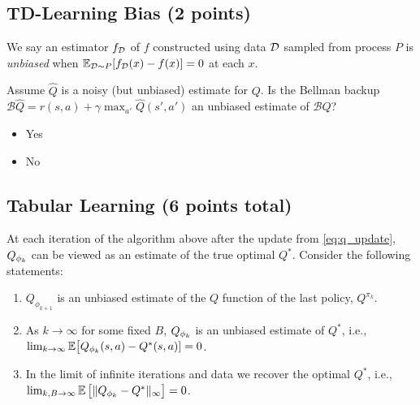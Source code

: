 \def\makecols#1#2{{\def\p{#2}\newcount\i\i0\hfill\loop\advance\i1\makebox[1cm][c]{\expandafter\p\the\i}\kern.5cm\ifnum\i<#1\repeat\kern-1cm}}
\def\heading#1{\bf\expandafter\uppercase\expandafter{\romannumeral#1.}}
\def\boxes#1{\ensuremath\square}
\def\filled#1#2|#3{\ifnum#1=#3\ensuremath\blacksquare
	\else\if\relax#2\relax\ensuremath\square
	\else\filled#2|#3\fi\fi}
\def\ncol{3}
\newcommand{\checkeditem}[2]{\edef\x{0#1}\item[\expandafter\filled\x|#2]}


\def\choices#1#2{
	\begin{enumerate}
	\item on-policy in tabular setting \makecols\ncol{\filled0#1|}
	\item off-policy in tabular setting \makecols\ncol{\filled0#2|}
	\end{enumerate}
}

\subsection{TD-Learning Bias (2 points)}
\label{q:td_bias}

\def\answer{2} %
\ifsolutions\solve\thesubsection\fi
We say an estimator $f_{\mathcal{D}}$ of $f$ constructed using data $\mathcal{D}$ sampled from process $P$ is \textit{unbiased} when $\mathbb{E}_{\mathcal{D}\sim P}[f_{\mathcal{D}}(x)-f(x)]=0$ at each $x$.

Assume $\hat Q$ is a noisy (but unbiased) estimate for $Q$. Is the Bellman backup $\mathcal{B}\hat Q = r(s, a) + \gamma \max_{a'} \hat Q(s', a')$ an unbiased estimate of $\mathcal{B}Q$?
\begin{itemize}
    \checkeditem\answer1 Yes
    \checkeditem\answer2 No
\end{itemize}

\subsection{Tabular Learning (6 points total)}
\label{q:tabular_learning}

At each iteration of the algorithm above after the update from \cref{eq:q_update}, $Q_{\phi_k}$ can be viewed as an estimate of the true optimal $Q^*$. Consider the following statements: 
\begin{enumerate}[label=\bf\Roman*.]
  \item $Q_{\phi_{k+1}}$ is an unbiased estimate of the $Q$ function of the last policy, $Q^{\pi_k}$.
  \item As $k\to\infty$ for some fixed $B$, $Q_{\phi_k}$ is an unbiased estimate of $Q^*$, i.e., $\lim_{k\to\infty} \mathbb{E}\bigl[Q_{\phi_k}(s,a)-Q^*(s,a)]=0$.
  \item In the limit of infinite iterations and data we recover the optimal $Q^*$, i.e., $\lim_{k,B\to\infty}\mathbb{E}\,\bigl[\|Q_{\phi_k}-Q^*\|_\infty\bigr]=0$.
\end{enumerate}

